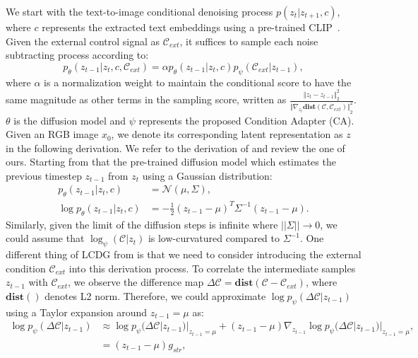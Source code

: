 \documentclass{article}
\begin{document}
We start with the text-to-image conditional denoising process $p ( z_t | z_{t+1}, c )$, where $c$ represents the extracted text embeddings using a pre-trained CLIP~\cite{radford2021learning}. Given the external control signal as $\mathcal{C}_{ext}$, it suffices to sample each noise subtracting process according to:
\begin{equation}
  p_\theta ( z_{t-1} | z_{t}, c, \mathcal{C}_{ext} ) = \alpha p_\theta ( z_{t-1} | z_{t}, c )  p_\psi ( \mathcal{C}_{ext} | z_{t-1} ),
\label{eqn1}
\end{equation}
where $\alpha$ is a normalization weight to maintain the conditional score to have the same magnitude as other terms in the sampling score, written as $\frac{{\Vert z_t - z_{t-1} \Vert}^2_2}{{\Vert \nabla_{z_t}\mathbf{dist}(\mathcal{C}, \mathcal{C}_{ext}) \Vert}^2_2}$. $\theta$ is the diffusion model and $\psi$ represents the proposed Condition Adapter (CA). Given an RGB image $x_0$, we denote its corresponding latent representation as $z$ in the following derivation. We refer to the derivation of \cite{dhariwal2021diffusion} and review the one of ours. Starting from that the pre-trained diffusion model \cite{rombach2022high} which estimates the previous timestep $z_{t-1}$ from $z_{t}$ using a Gaussian distribution:
\begin{equation}
  \begin{aligned}    
    p_\theta ( z_{t-1} | z_{t}, c ) &= \mathcal{N} ( \mu, \Sigma ), \\
    \log p_\theta ( z_{t-1} | z_{t}, c ) &= -\frac{1}{2} ( z_{t-1} - \mu )^T \Sigma^{-1} ( z_{t-1} - \mu ).
  \label{eqn2}
  \end{aligned}
\end{equation}
Similarly, given the limit of the diffusion steps is infinite where $||\Sigma|| \rightarrow 0$, we could assume that $\log_{\psi} ( \mathcal{C} | z_t )$ is low-curvatured compared to $\Sigma^{-1}$. One different thing of LCDG from \cite{dhariwal2021diffusion} is that we need to consider introducing the external condition $\mathcal{C}_{ext}$ into this derivation process. To correlate the intermediate samples $z_{t-1}$ with $\mathcal{C}_{ext}$, we observe the difference map $\Delta \mathcal{C} = \mathbf{dist} ( \mathcal{C} - \mathcal{C}_{ext} )$, where $\mathbf{dist()}$ denotes L2 norm. Therefore, we could approximate $\log p_\psi ( \Delta \mathcal{C} | z_{t-1} )$ using a Taylor expansion around $z_{t-1} = \mu$ as:
\begin{equation}
  \begin{aligned}
    \log p_\psi ( \Delta \mathcal{C} | z_{t-1} ) &\approx \log p_\psi ( \Delta \mathcal{C} | z_{t-1} ) |_{z_{t-1} = \mu} + ( z_{t-1} - \mu ) \nabla_{z_{t-1}} \log p_{\psi} ( \Delta \mathcal{C} | z_{t-1} ) |_{z_{t-1}=\mu},\\
    &= ( z_{t-1} - \mu ) g_{str},
    \label{eqn3}
  \end{aligned}
\end{equation}
\end{document}
